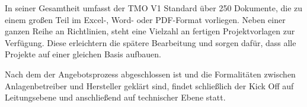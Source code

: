 In seiner Gesamtheit umfasst der TMO V1 Standard über 250 Dokumente, die zu einem großen Teil im Excel-, Word- oder PDF-Format vorliegen. Neben einer ganzen Reihe an Richtlinien, steht eine Vielzahl an fertigen Projektvorlagen zur Verfügung. Diese erleichtern die spätere Bearbeitung und sorgen dafür, dass alle Projekte auf einer gleichen Basis aufbauen.

Nach dem der Angebotsprozess abgeschlossen ist und die Formalitäten zwischen Anlagenbetreiber und Hersteller geklärt sind, findet schließlich der Kick Off auf Leitungsebene und anschließend auf technischer Ebene statt.
